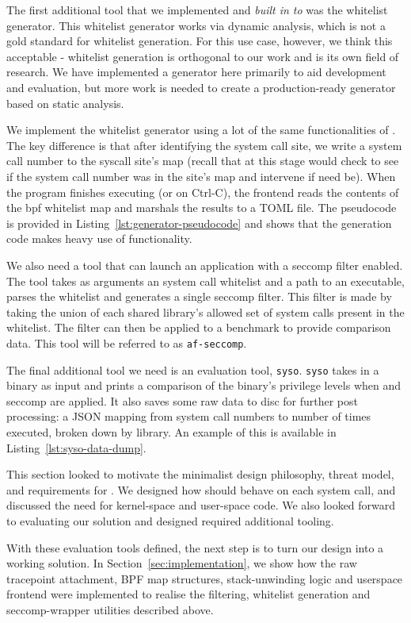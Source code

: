 The first additional tool that we implemented and \textit{built in to \af} was
the whitelist generator. This whitelist generator works via dynamic analysis,
which is not a gold standard for whitelist generation. For this use case,
however, we think this acceptable - whitelist generation is orthogonal to our
work and is its own field of research. We have implemented a generator here
primarily to aid development and evaluation, but more work is needed to create a
production-ready generator based on static analysis.

We implement the whitelist generator using a lot of the same functionalities of
\af. The key difference is that after identifying the system call site, we write a
system call number to the syscall site's map (recall that at this stage \af would
check to see if the system call number was in the site's map and intervene if need
be). When the program finishes executing (or on Ctrl-C), the frontend reads the
contents of the bpf whitelist map and marshals the results to a TOML file.
The pseudocode is provided in Listing~\ref{lst:generator-pseudocode} and shows
that the generation code makes heavy use of \afg functionality.

We also need a tool that can launch an application with a seccomp filter enabled.
The tool takes as arguments an \af system call whitelist
and a path to an executable, parses the whitelist and generates a single
seccomp filter. This filter is made by taking the union of each shared 
library's allowed set of system calls present in the \af whitelist. The filter can
then be applied to a benchmark to provide comparison data. This tool will be
referred to as \texttt{af-seccomp}.

The final additional tool we need is an evaluation tool, \texttt{syso}.
\texttt{syso} takes in a binary as input and prints a comparison of the 
binary's privilege levels  when \af and seccomp are applied. It also saves
some raw data to disc for further post processing: a JSON mapping from
system call numbers to number of times executed, broken down by library. An
example of this is available in Listing~\ref{lst:syso-data-dump}.

This section looked to motivate the minimalist design philosophy, threat model,
and requirements for \af. We designed how \af should behave on each system call,
and discussed the need for kernel-space and user-space code. We also looked
forward to evaluating our solution and designed required additional tooling.

With these evaluation tools defined, the next step is to turn our design into a
working solution. In Section \ref{sec:implementation}, we show how the raw 
tracepoint attachment, BPF map structures, stack-unwinding logic and userspace 
frontend were implemented to realise the filtering, whitelist generation and 
seccomp-wrapper utilities described above.
